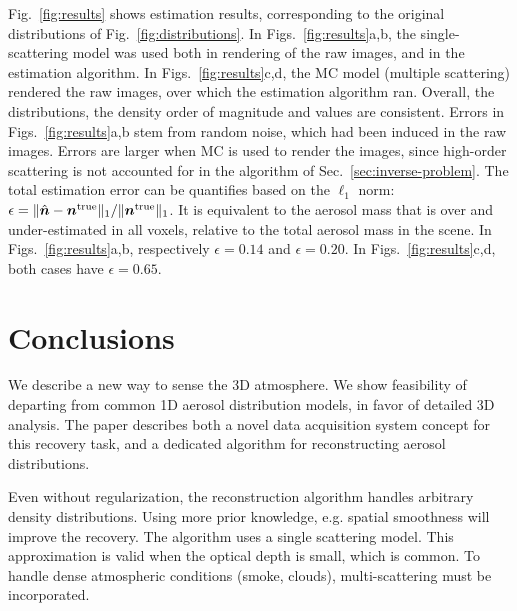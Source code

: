 \documentclass[10pt,letterpaper]{article}
\begin{document}
Fig.~\ref{fig:results} shows estimation results, corresponding to the
original distributions of Fig.~\ref{fig:distributions}. In
Figs.~\ref{fig:results}a,b, the single-scattering model was used both
in rendering of the raw images, and in the estimation algorithm. In
Figs.~\ref{fig:results}c,d, the MC model (multiple scattering)
rendered the raw images, over which the estimation algorithm
ran. Overall, the distributions, the density order of magnitude and
values are consistent.
Errors in Figs.~\ref{fig:results}a,b stem from random noise, which had
been induced in the raw images. Errors are larger when MC is used to
render the images, since high-order scattering is not accounted for in
the algorithm of Sec.~\ref{sec:inverse-problem}. The total estimation
error can be quantifies based on the $\ell_1$ norm: $\epsilon=\|
\hat{\bm n} - {\bm n}^{\rm true} \|_1 / \| {\bm n}^{\rm true} \|_1$.
It is equivalent to the aerosol mass that is over and under-estimated
in all voxels, relative to the total aerosol mass in the scene.  In
Figs.~\ref{fig:results}a,b, respectively $\epsilon=0.14$ and
$\epsilon=0.20$.  In Figs.~\ref{fig:results}c,d, both cases have
$\epsilon=0.65$.



\section{Conclusions}
\label{sec:conclusions}

We describe a new way to sense the 3D atmosphere. We show feasibility
of departing from common 1D aerosol distribution models, in favor of
detailed 3D analysis.  The paper describes both a novel data
acquisition system concept for this recovery task, and a dedicated
algorithm for reconstructing aerosol distributions.

Even without regularization, the reconstruction algorithm handles
arbitrary density distributions. Using more prior knowledge,
e.g. spatial smoothness will improve the recovery.  The algorithm uses
a single scattering model. This approximation is valid when the
optical depth is small, which is common. To handle dense atmospheric
conditions (smoke, clouds), multi-scattering must be incorporated.
\end{document}
